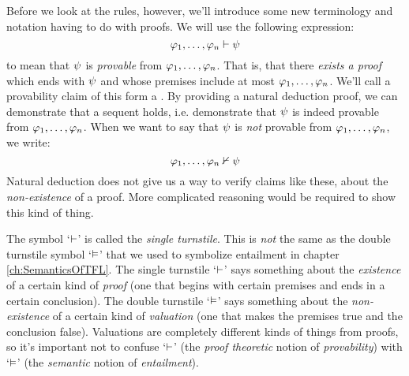 Before we look at the rules, however, we'll introduce some new terminology and notation having to do with proofs.  We will use the following expression:
$$\mathcal{\varphi}_1, \ldots, \mathcal{\varphi}_n \vdash \mathcal{\psi}$$
to mean that $\mathcal{\psi}$ is \emph{provable} from $\mathcal{\varphi}_1, \ldots, \mathcal{\varphi}_n$.  That is, that there \emph{exists a proof} which ends with $\mathcal{\psi}$ and whose premises include at most $\mathcal{\varphi}_1, \ldots, \mathcal{\varphi}_n$. We'll call a provability claim of this form a .  By providing a natural deduction proof, we can demonstrate that a sequent holds, i.e. demonstrate that $\mathcal{\psi}$ is indeed provable from $\mathcal{\varphi}_1, \ldots, \mathcal{\varphi}_n$.  When we want to say that $\mathcal{\psi}$ is \emph{not} provable from $\mathcal{\varphi}_1, \ldots, \mathcal{\varphi}_n$, we write:
$$\mathcal{\varphi}_1, \ldots, \mathcal{\varphi}_n \nvdash \mathcal{\psi}$$
Natural deduction does not give us a way to verify claims like these, about the \emph{non-existence} of a proof. More complicated reasoning would be required to show this kind of thing.


The symbol `$\vdash$' is called the \emph{single turnstile}.  This is \emph{not} the same as the double turnstile symbol `$\vDash$' that we used to symbolize entailment in chapter \ref{ch:SemanticsOfTFL}. The single turnstile `$\vdash$' says something about the \emph{existence} of a certain kind of \emph{proof} (one that begins with certain premises and ends in a certain conclusion).  The double turnstile `$\vDash$' says something about the \emph{non-existence} of a certain kind of \emph{valuation} (one that makes the premises true and the conclusion false).  Valuations are completely different kinds of things from proofs, so it's important not to confuse `$\vdash$' (the \emph{proof theoretic} notion of \emph{provability}) with `$\vDash$' (the \emph{semantic} notion of \emph{entailment}).

